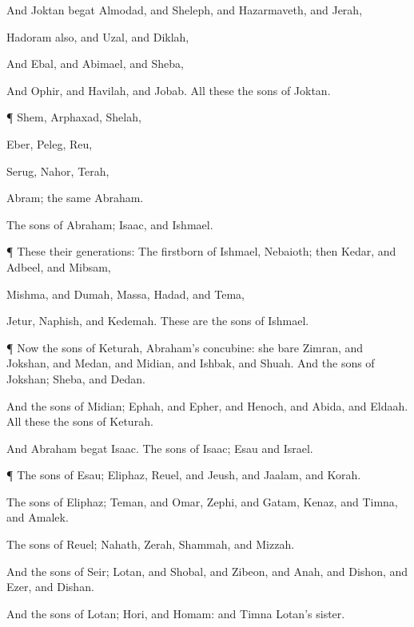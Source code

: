 {And
Joktan
begat
Almodad, and
Sheleph, and
Hazarmaveth, and
Jerah,

Hadoram also, and
Uzal, and
Diklah,

And
Ebal, and
Abimael, and
Sheba,

And
Ophir, and
Havilah, and
Jobab. All these
{} the
sons of
Joktan.


\par }{\PP {}¶
Shem,
Arphaxad,
Shelah,

Eber,
Peleg,
Reu,

Serug,
Nahor,
Terah,

Abram; the same
{}
Abraham.


\par }{\PP {}The
sons of
Abraham;
Isaac, and
Ishmael.


\par }{\PP {}¶ These
{} their
generations: The
firstborn of
Ishmael,
Nebaioth; then
Kedar, and
Adbeel, and
Mibsam,

Mishma, and
Dumah,
Massa,
Hadad, and
Tema,

Jetur,
Naphish, and
Kedemah. These are the
sons of
Ishmael.


\par }{\PP {}¶ Now the
sons of
Keturah,
Abraham’s
concubine: she
bare
Zimran, and
Jokshan, and
Medan, and
Midian, and
Ishbak, and
Shuah. And the
sons of
Jokshan;
Sheba, and
Dedan.

And the
sons of
Midian;
Ephah, and
Epher, and
Henoch, and
Abida, and
Eldaah. All these
{} the
sons of
Keturah.

And
Abraham
begat
Isaac. The
sons of
Isaac;
Esau and
Israel.


\par }{\PP {}¶ The
sons of
Esau;
Eliphaz,
Reuel, and
Jeush, and
Jaalam, and
Korah.

The
sons of
Eliphaz;
Teman, and
Omar,
Zephi, and
Gatam,
Kenaz, and
Timna, and
Amalek.

The
sons of
Reuel;
Nahath,
Zerah,
Shammah, and
Mizzah.

And the
sons of
Seir;
Lotan, and
Shobal, and
Zibeon, and
Anah, and
Dishon, and
Ezer, and
Dishan.

And the
sons of
Lotan;
Hori, and
Homam: and
Timna
{}
Lotan’s
sister.

}

